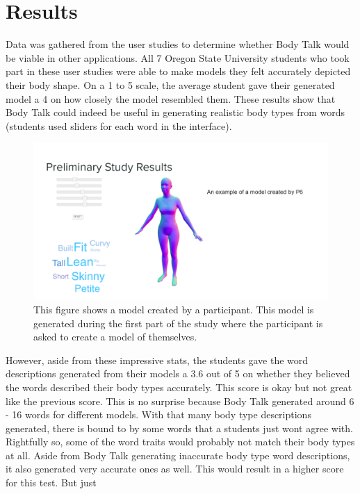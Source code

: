 \documentclass[journal]{vgtc}                %
\begin{document}
\section{Results}

\noindent Data was gathered from the user studies to determine whether Body Talk would be viable in other applications. All 7 Oregon State University 
students who took part in these user studies were able to make models they felt accurately depicted their body shape. On a 1 to 5 scale, the average 
student gave their generated model a 4 on how closely the model resembled them. These results show that Body Talk could indeed be useful in generating 
realistic body types from words (students used sliders for each word in the interface). \newline
\begin{figure}[!htb]
	\includegraphics[width=\columnwidth]{user_self_creation.png}
	\caption{This figure shows a model created by a participant. This model is generated during the first part of the study where the participant is asked to create a model of themselves.}
\end{figure}
\noindent However, aside from these impressive stats, the students gave the word descriptions generated from their models a 3.6 out of 5 
on whether  they 
believed the words described their body types accurately. This score is okay but not great like the previous score. This is no surprise 
because Body Talk 
generated around 6 - 16 words for different models. With that many body type descriptions generated, there is bound to by some words 
that a students just 
wont agree with. Rightfully so, some of the word traits would probably not match their body types at all. Aside from Body Talk 
generating inaccurate body 
type word descriptions, it also generated very accurate ones as well. This would result in a higher score for this test. But just 
\end{document}
